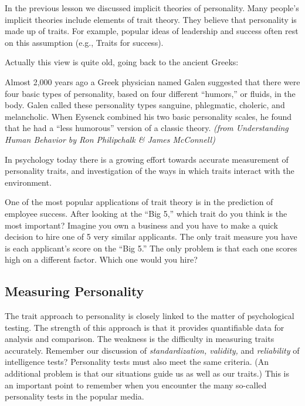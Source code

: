 \documentclass[
]{book}
\begin{document}
In the previous lesson we discussed implicit theories of personality. Many people's implicit theories include elements of trait theory. They believe that personality is made up of traits. For example, popular ideas of leadership and success often rest on this assumption (e.g., Traits for success).

Actually this view is quite old, going back to the ancient Greeks:

Almost 2,000 years ago a Greek physician named Galen suggested that there were four basic types of personality, based on four different ``humors,'' or fluids, in the body. Galen called these personality types sanguine, phlegmatic, choleric, and melancholic. When Eysenck combined his two basic personality scales, he found that he had a ``less humorous'' version of a classic theory. \emph{(from Understanding Human Behavior by Ron Philipchalk \& James McConnell)}

In psychology today there is a growing effort towards accurate measurement of personality traits, and investigation of the ways in which traits interact with the environment.

One of the most popular applications of trait theory is in the prediction of employee success. After looking at the ``Big 5,'' which trait do you think is the most important? Imagine you own a business and you have to make a quick decision to hire one of 5 very similar applicants. The only trait measure you have is each applicant's score on the ``Big 5.'' The only problem is that each one scores high on a different factor. Which one would you hire?

\hypertarget{measuring-personality}{%
\subsection*{Measuring Personality}\label{measuring-personality}}

The trait approach to personality is closely linked to the matter of psychological testing. The strength of this approach is that it provides quantifiable data for analysis and comparison. The weakness is the difficulty in measuring traits accurately. Remember our discussion of \emph{standardization, validity,} and \emph{reliability} of intelligence tests? Personality tests must also meet the same criteria. (An additional problem is that our situations guide us as well as our traits.) This is an important point to remember when you encounter the many so-called personality tests in the popular media.
\end{document}
